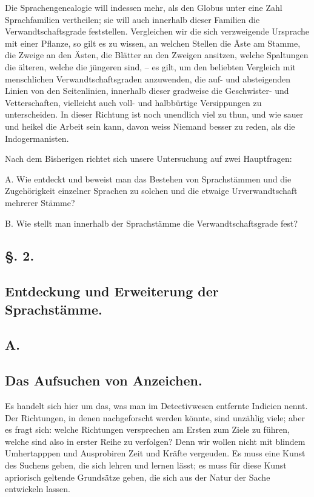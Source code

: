 \label{fp.154}

\largerpage[1]Die Sprachengenealogie will indessen mehr, als den Globus unter eine Zahl Sprachfamilien vertheilen; sie will auch innerhalb dieser Familien die Verwandtschaftsgrade feststellen. Vergleichen wir die sich verzweigende Ursprache mit einer Pflanze, so gilt es zu wissen, an welchen Stellen die Äste am Stamme, die Zweige an den Ästen, die Blätter an den Zweigen ansitzen, welche Spaltungen die älteren, welche die jüngeren sind, – es gilt, um den beliebten Vergleich mit menschlichen Verwandtschaftsgraden anzuwenden, die auf- und absteigenden Linien von den Seitenlinien, innerhalb dieser gradweise die Geschwister- und Vetterschaften, vielleicht auch voll- und halbbürtige Versippungen zu unterscheiden. In dieser Richtung ist noch unendlich viel zu thun, und wie sauer und heikel die Arbeit sein kann, davon weiss Niemand besser zu reden, als die Indogermanisten.

Nach dem Bisherigen richtet sich unsere Untersuchung auf zwei Hauptfragen:

A. Wie entdeckt und beweist man das Bestehen von Sprachstämmen und die Zugehörigkeit einzelner Sprachen zu solchen und die etwaige Urverwandtschaft mehrerer Stämme?

B. Wie stellt man innerhalb der Sprachstämme die Verwandtschaftsgrade fest?

\subsection*{§. 2.}\label{III.I.I.2}
\subsection*{Entdeckung und Erweiterung der Sprachstämme.}
\subsection*{A.}\label{III.I.I.2A}
\subsection*{Das Aufsuchen von Anzeichen.}
Es handelt sich hier um das, was man im Detectivwesen entfernte Indicien nennt. Der Richtungen, in denen nachgeforscht werden könnte, sind unzählig viele; aber es fragt sich: welche Richtungen versprechen am Ersten zum Ziele zu führen, welche sind also in erster Reihe zu verfolgen? Denn wir wollen nicht mit blindem Umhertapppen und Ausprobiren Zeit und Kräfte vergeuden. \label{sp.146} Es muss eine Kunst des Suchens geben, die sich lehren und lernen lässt; es muss für diese Kunst apriorisch geltende Grundsätze geben, die sich aus der Natur der Sache entwickeln lassen.

